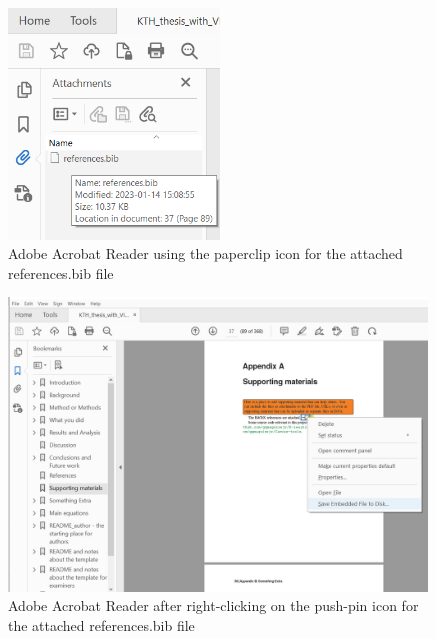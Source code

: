 \documentclass[nomenclature, english, bibtex]{kththesis}
\numberwithin{listing}{chapter}
\begin{document}
\begin{figure}[!ht]
  \begin{center}
    \includegraphics[width=0.50\textwidth]{README_notes/pdf-viewer-attached-files.png}
  \end{center}
  \caption{Adobe Acrobat Reader using the paperclip icon for the attached references.bib file}
  \label{fig:PDFreaderPaperclipExample}
\end{figure}
\FloatBarrier

\begin{figure}[!ht]
  \begin{center}
    \includegraphics[width=0.99\textwidth]{README_notes/Bib-save-embedded-example.png}
  \end{center}
  \caption{Adobe Acrobat Reader after right-clicking on the push-pin icon for the attached references.bib file}
  \label{fig:PDFreaderPushpinExample}
\end{figure}
\FloatBarrier
\cleardoublepage
\end{document}
